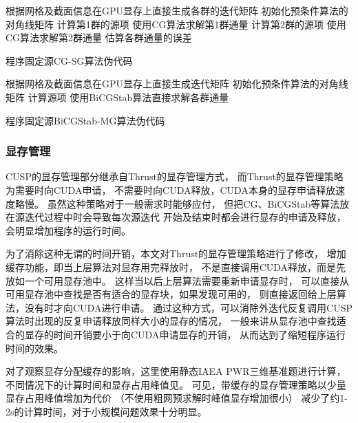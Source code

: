 \begin{algorithm}
根据网格及截面信息在GPU显存上直接生成各群的迭代矩阵\;
初始化预条件算法的对角线矩阵\;
{
  计算第1群的源项\;
  使用CG算法求解第1群通量\;
  计算第2群的源项\;
  使用CG算法求解第2群通量\;
  估算各群通量的误差\;
}
\caption{\label{alg:program.kinetics.cg-sg}
\ProgramName 程序固定源CG-SG算法伪代码}
\end{algorithm}


\begin{algorithm}
根据网格及截面信息在GPU显存上直接生成迭代矩阵\;
初始化预条件算法的对角线矩阵\;
计算源项\;
使用BiCGStab算法直接求解各群通量\;
\caption{\label{alg:program.kinetics.bicgstab-mg}
\ProgramName 程序固定源BiCGStab-MG算法伪代码}
\end{algorithm}


\subsubsection{显存管理}

CUSP的显存管理部分继承自Thrust的显存管理方式，
而Thrust的显存管理策略为需要时向CUDA申请，
不需要时向CUDA释放，CUDA本身的显存申请释放速度略慢。
虽然这种策略对于一般需求时能够应付，
但把CG、BiCGStab等算法放在源迭代过程中时会导致每次源迭代
开始及结束时都会进行显存的申请及释放，
会明显增加程序的运行时间。

为了消除这种无谓的时间开销，本文对Thrust的显存管理策略进行了修改，
增加缓存功能，即当上层算法对显存用完释放时，
不是直接调用CUDA释放，而是先放如一个可用显存池中。
这样当以后上层算法需要重新申请显存时，
可以直接从可用显存池中查找是否有适合的显存块，如果发现可用的，
则直接返回给上层算法，没有时才向CUDA进行申请。
通过这种方式，可以消除外迭代反复调用CUSP算法时出现的反复申请释放同样大小的显存的情况，
一般来讲从显存池中查找适合的显存的时间开销要小于向CUDA申请显存的开销，
从而达到了缩短程序运行时间的效果。

对了观察显存分配缓存的影响，这里使用静态IAEA PWR三维基准题进行计算，
不同情况下的计算时间和显存占用峰值见。
可见，带缓存的显存管理策略以少量显存占用峰值增加为代价
（不使用粗网预求解时峰值显存增加很小）
减少了约1-2s的计算时间，对于小规模问题效果十分明显。

